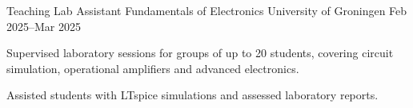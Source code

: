 \begin{cventries}
  \cventry
  {Teaching Lab Assistant} %
  {Fundamentals of Electronics} %
  {University of Groningen} %
  {Feb 2025--Mar 2025} %
  {
    \begin{cvitems} %
      \item {Supervised laboratory sessions for groups of up to 20 students, covering circuit simulation, operational amplifiers and advanced electronics.}
      \item {Assisted students with LTspice simulations and assessed laboratory reports.}
    \end{cvitems}
  }




\end{cventries}
